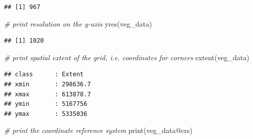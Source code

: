 \documentclass[
  12pt,
]{book}
\newenvironment{Shaded}{\begin{snugshade}}{\end{snugshade}}
\newcommand{\CommentTok}[1]{\textcolor[rgb]{0.56,0.35,0.01}{\textit{#1}}}
\newcommand{\FunctionTok}[1]{\textcolor[rgb]{0.00,0.00,0.00}{#1}}
\newcommand{\NormalTok}[1]{#1}
\newcommand{\SpecialCharTok}[1]{\textcolor[rgb]{0.00,0.00,0.00}{#1}}
\begin{document}
\begin{verbatim}
## [1] 967
\end{verbatim}

\begin{Shaded}
\begin{Highlighting}[]
\CommentTok{\# print resolution on the y{-}axis}
\FunctionTok{yres}\NormalTok{(veg\_data)}
\end{Highlighting}
\end{Shaded}

\begin{verbatim}
## [1] 1020
\end{verbatim}

\begin{Shaded}
\begin{Highlighting}[]
\CommentTok{\# print spatial extent of the grid, i.e. coordinates for corners}
\FunctionTok{extent}\NormalTok{(veg\_data)}
\end{Highlighting}
\end{Shaded}

\begin{verbatim}
## class      : Extent 
## xmin       : 298636.7 
## xmax       : 613878.7 
## ymin       : 5167756 
## ymax       : 5335036
\end{verbatim}

\begin{Shaded}
\begin{Highlighting}[]
\CommentTok{\# print the coordinate reference system}
\FunctionTok{print}\NormalTok{(veg\_data}\SpecialCharTok{@}\NormalTok{crs)}
\end{Highlighting}
\end{Shaded}
\end{document}

